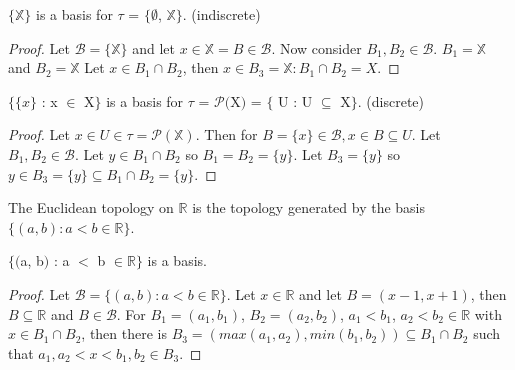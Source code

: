 \documentclass{article}
\begin{document}
	\begin{theorem}
	$\lbrace\mathbb{X}\rbrace$ is a basis for $\tau$ = $\lbrace\emptyset$, $\mathbb{X}\rbrace$. (indiscrete)
	\end{theorem}
	\begin{proof}
	Let $\mathcal{B} = \lbrace\mathbb{X}\rbrace$ and let $x \in \mathbb{X} = B \in \mathcal{B}$. Now consider $B_1, B_2 \in \mathcal{B}$. $B_1 = \mathbb{X}$ and $B_2 = \mathbb{X}$ Let $x \in B_1 \cap B_2$, then $x \in B_3 = \mathbb{X} : B_1 \cap B_2 = X$.
	\end{proof}

	\begin{theorem}
	$\lbrace\lbrace x \rbrace$ : x $\in$ X$\rbrace$ is a basis for $\tau$ = $\mathcal{P}($X$)$ = $\lbrace$ U : U $\subseteq$ X$\rbrace$. (discrete)
	\end{theorem}
	\begin{proof}
	Let $x \in U \in \tau = \mathcal{P}(\mathbb{X})$. Then for $B = \lbrace x \rbrace \in \mathcal{B}, x \in B \subseteq U$. Let $B_1, B_2 \in \mathcal{B}$. Let $y \in B_1 \cap B_2$ so $B_1 = B_2 = \lbrace y \rbrace$. Let $B_3 = \lbrace y \rbrace$ so $y \in B_3 = \lbrace y \rbrace \subseteq B_1 \cap B_2 = \lbrace y \rbrace$. 
	\end{proof}

	\begin{definition}
	The Euclidean topology on $\mathbb{R}$ is the topology generated by the basis \newline $\lbrace(a, b) : a < b \in \mathbb{R}\rbrace$.
	\end{definition}

	\begin{theorem}
	$\lbrace($a, b$)$ : a $<$ b $\in \mathbb{R}\rbrace$ is a basis.
	\end{theorem}
	\begin{proof}
	Let $\mathcal{B} = \lbrace (a, b) : a < b \in \mathbb{R} \rbrace$. Let $x \in \mathbb{R}$ and let $B = (x-1, x+1)$, then $B \subseteq \mathbb{R}$ and $B \in \mathcal{B}$. \newline For $B_1 = (a_1, b_1)$, $B_2 = (a_2, b_2)$, $a_1<b_1$, $a_2<b_2 \in \mathbb{R}$ with $x \in B_1 \cap B_2$, then there is $B_3 = ( max(a_1, a_2), min(b_1, b_2) ) \subseteq B_1 \cap B_2$ such that $a_1,a_2<x<b_1,b_2 \in B_3$.\newline\newline\newline\newline\newline
	\end{proof}
\end{document}
